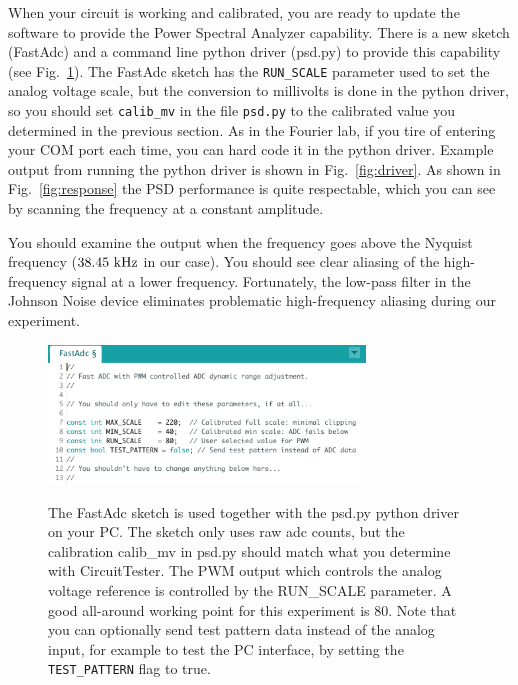 \documentclass[12pt]{article}
\begin{document}
When your circuit is working and calibrated, you are ready to update the software to provide the Power Spectral Analyzer capability.  There is a new sketch (FastAdc) and a command line python driver (psd.py)
to provide this capability (see Fig.~\ref{fig:fastadc}).  The FastAdc sketch has the {\tt RUN\_SCALE} parameter used to set the analog voltage scale, but the conversion to millivolts is done in the python driver, so you should set {\tt calib\_mv} in the file {\tt psd.py} to the calibrated value you determined in the previous section.  As in the Fourier lab, if you tire of entering your COM port each time, you can hard code it in the python driver.   Example output from running the python driver is shown in Fig.~\ref{fig:driver}.  As shown in Fig.~\ref{fig:response} the PSD performance is quite respectable, which you can see by scanning the frequency at a constant amplitude.  

You should examine the output when the frequency goes above the Nyquist frequency ($38.45~\rm kHz$ in our case).  You should see clear aliasing of the high-frequency signal at a lower frequency.  Fortunately, the low-pass filter in the Johnson Noise device eliminates problematic high-frequency aliasing during our experiment.

\begin{figure}[htbp]
\begin{center}
{\includegraphics[width=0.75\textwidth]{figs/fast_adc.png}}
\end{center}
\caption{\label{fig:fastadc}    
The FastAdc sketch is used together with the psd.py python driver on your PC.  The sketch only uses raw adc counts, but the calibration calib\_mv in psd.py should match what you determine with CircuitTester.  
The PWM output which controls the analog voltage reference is controlled by the RUN\_SCALE parameter.
A good all-around working point for this experiment is 80.  Note that you can optionally send test pattern data instead of the analog input, for example to test the PC interface, by setting the {\tt TEST\_PATTERN} flag to true.
}\end{figure}
\end{document}
